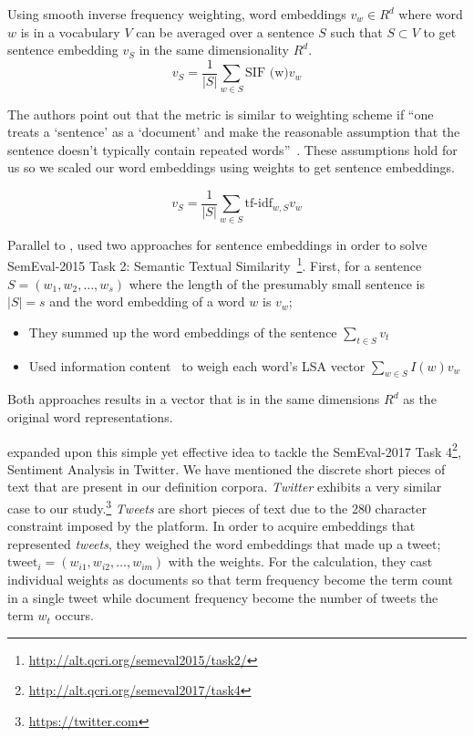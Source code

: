Using smooth inverse frequency weighting, word embeddings $v_w \in R^{d}$ where word $w$ is in a vocabulary $V$ can be averaged over a sentence $S$ such that $S \subset V$ to get sentence embedding $v_S$ in the same dimensionality $R^{d}$.
\begin{equation}
    v_S = \frac{1}{|S|}\sum_{w \in S}\text{SIF (w)}v_{w}
\end{equation}

The authors point out that the metric is similar to \tfidf{} weighting scheme if \enquote{one treats a \enquote{sentence} as a \enquote{document} and make the reasonable assumption that the sentence doesn't typically contain repeated words}~\cite{arora_simple_2016}.
These assumptions hold for us so we scaled our word embeddings using \tfidf{} weights to get sentence embeddings.

\begin{equation}
    v_S = \frac{1}{|S|}\sum_{w \in S}\text{tf-idf}_{w,S} v_w
\end{equation}

Parallel to \citeauthor{arora_simple_2016}, \textcite{zhao_ecnu_2015} used two approaches for sentence embeddings in order to solve SemEval-2015 Task 2: Semantic Textual Similarity~\footnote{\url{http://alt.qcri.org/semeval2015/task2/}}.
First, for a sentence $S = (w_{1}, w_{2}, \dots, w_{s})$ where the length of the presumably small sentence is $|S| = s$ and the word embedding of a word $w$ is $v_w$;
\begin{itemize}
    \item They summed up the word embeddings of the sentence $\sum_{t \in S}v_{t}$
    \item Used information content~\cite{saric_takelab_2012} to weigh each word's LSA vector $\sum_{w \in S} I(w) v_{w}$
\end{itemize}
Both approaches results in a vector that is in the same dimensions $R^{d}$ as the original word representations.

\textcite{edilson_a._correa_nilc-usp_2017} expanded upon this simple yet effective idea to tackle the SemEval-2017 Task 4\footnote{\url{http://alt.qcri.org/semeval2017/task4}}, Sentiment Analysis in Twitter.
We have mentioned the discrete short pieces of text that are present in our definition corpora.
\emph{Twitter} exhibits a very similar case to our study.\footnote{\url{https://twitter.com}}
\emph{Tweets} are short pieces of text due to the 280 character constraint imposed by the platform.
In order to acquire embeddings that represented \emph{tweets}, they weighed the word embeddings that made up a tweet; $\text{tweet}_i = (w_{i1}, w_{i2}, \dots, w_{im})$ with the \tfidf{} weights.
For the \tfidf{} calculation, they cast individual weights as documents so that term frequency become the term count in a single tweet while document frequency become the number of tweets the term $w_t$ occurs.

